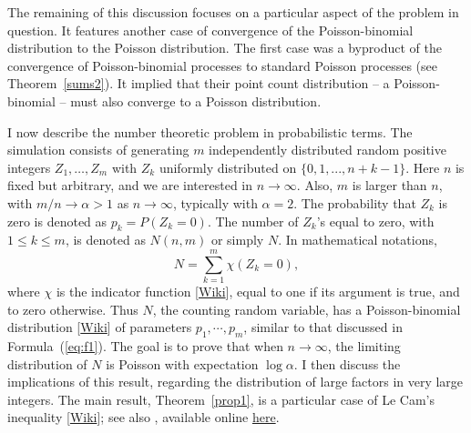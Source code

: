 \documentclass[10pt]{article}
\begin{document}
The remaining of this discussion focuses on a particular aspect of the problem in question. It features another case of convergence of the \textcolor{index}{Poisson-binomial distribution}  to the 
\textcolor{index}{Poisson distribution}. The first case was a byproduct of
the convergence of \textcolor{index}{Poisson-binomial processes} to standard 
\textcolor{index}{Poisson processes} (see Theorem~\ref{sums2}). It implied that  their point count distribution -- a Poisson-binomial -- must also converge to a Poisson distribution.  \\

 
\noindent I now describe the number theoretic problem in probabilistic terms. The simulation consists of generating $m$ independently distributed random positive integers $Z_1,\dots, Z_m$ with $Z_k$ uniformly distributed on $\{0,1,...,n+k-1\}$. Here $n$ is fixed but arbitrary, and we are interested in $n\rightarrow\infty$. Also, $m$ is larger than $n$, with $m/n \rightarrow \alpha > 1$ as $n\rightarrow\infty$, typically with $\alpha=2$. The probability that $Z_k$ is zero is denoted as $p_k=P(Z_k=0)$. The number of $Z_k$'s equal to zero, with $1\leq k \leq m$, is denoted as $N(n,m)$ or simply $N$. In mathematical notations,
\begin{equation}
  N = \sum_{k=1}^m \chi(Z_k =0), \label{plp}
\end{equation}
where $\chi$ is the indicator function [\href{https://en.wikipedia.org/wiki/Indicator_function}{Wiki}], equal to one if its argument is true, and to zero otherwise. 
Thus $N$, the counting random variable, has a 
Poisson-binomial distribution [\href{https://en.wikipedia.org/wiki/Poisson_binomial_distribution}{Wiki}] of parameters $p_1,\cdots,p_m$, similar to that discussed
in Formula~(\ref{eq:f1}). The goal is to prove that when $n\rightarrow\infty$, the limiting distribution of $N$ is Poisson with expectation $\log \alpha$. I then discuss the implications of this result, regarding the distribution of large factors in very large integers. The main result, Theorem~\ref{prop1}, is a particular case of \textcolor{index}{Le Cam's inequality} [\href{https://en.wikipedia.org/wiki/Le_Cam's_theorem}{Wiki}]; see also \cite{lecam}, available online 
\href{http://www-stat.wharton.upenn.edu/~steele/Papers/PDF/LIaPA.pdf}{here}.  \\
\end{document}
